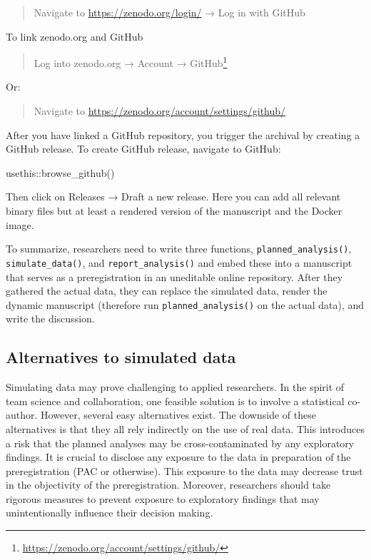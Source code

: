 \documentclass[psych,tutorial,submit,moreauthors,pdftex]{mdpi}
\newenvironment{Shaded}{\begin{snugshade}}{\end{snugshade}}
\newcommand{\FunctionTok}[1]{\textcolor[rgb]{0.00,0.00,0.00}{#1}}
\newcommand{\NormalTok}[1]{#1}
\newcommand{\SpecialCharTok}[1]{\textcolor[rgb]{0.00,0.00,0.00}{#1}}
\begin{document}
\begin{quote}
Navigate to \url{https://zenodo.org/login/} → Log in with GitHub
\end{quote}

\noindent{}To link zenodo.org and GitHub

\begin{quote}
Log into zenodo.org → Account → GitHub\footnote{\url{https://zenodo.org/account/settings/github/}}
\end{quote}

\noindent{}Or:

\begin{quote}
Navigate to \url{https://zenodo.org/account/settings/github/}
\end{quote}

After you have linked a GitHub repository, you trigger the archival by
creating a GitHub release. To create GitHub release, navigate to GitHub:

\begin{Shaded}
\begin{Highlighting}[]
\NormalTok{usethis}\SpecialCharTok{::}\FunctionTok{browse\_github}\NormalTok{()}
\end{Highlighting}
\end{Shaded}

Then click on Releases → Draft a new release. Here you can add all
relevant binary files but at least a rendered version of the manuscript
and the Docker image.

To summarize, researchers need to write three functions,
\texttt{planned\_analysis()}, \texttt{simulate\_data()}, and
\texttt{report\_analysis()} and embed these into a manuscript that
serves as a preregistration in an uneditable online repository. After
they gathered the actual data, they can replace the simulated data,
render the dynamic manuscript (therefore run
\texttt{planned\_analysis()} on the actual data), and write the
discussion.

\hypertarget{alternatives-to-simulated-data}{%
\subsection{Alternatives to simulated
data}\label{alternatives-to-simulated-data}}

Simulating data may prove challenging to applied researchers. In the
spirit of team science and collaboration, one feasible solution is to
involve a statistical co-author. However, several easy alternatives
exist. The downside of these alternatives is that they all rely
indirectly on the use of real data. This introduces a risk that the
planned analyses may be cross-contaminated by any exploratory findings.
It is crucial to disclose any exposure to the data in preparation of the
preregistration (PAC or otherwise). This exposure to the data may
decrease trust in the objectivity of the preregistration. Moreover,
researchers should take rigorous measures to prevent exposure to
exploratory findings that may unintentionally influence their decision
making.
\end{document}
